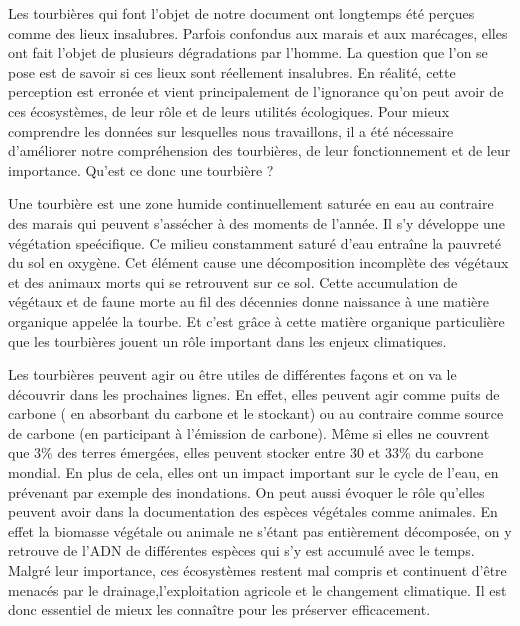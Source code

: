 \documentclass[a4paper,12pt]{report}%
\begin{document}
\begin{justify}

Les tourbières qui font l’objet de notre document ont longtemps été perçues comme des lieux insalubres. Parfois confondus aux marais et aux marécages, elles ont fait l’objet de plusieurs dégradations par l’homme. La question que l’on se pose est de savoir si ces lieux sont réellement insalubres. En réalité, cette perception est erronée et vient principalement de l’ignorance qu’on peut avoir de ces écosystèmes, de leur rôle et de leurs utilités écologiques. Pour mieux comprendre les données sur lesquelles nous travaillons, il a été nécessaire d’améliorer notre compréhension des tourbières, de leur fonctionnement et de leur importance. Qu'est ce donc une tourbière ? \newline					


 Une tourbière est une zone humide continuellement saturée en eau au contraire des marais qui peuvent s’assécher à des moments de l’année. Il s'y développe une végétation speécifique. Ce milieu constamment saturé d’eau entraîne la pauvreté du sol en oxygène.  Cet élément cause une  décomposition incomplète des végétaux et des animaux morts qui se retrouvent sur ce sol. Cette accumulation de végétaux et de faune morte au fil des décennies donne naissance à une matière organique appelée la tourbe.  Et c'est  grâce à cette matière organique particulière que les tourbières jouent un rôle important dans les enjeux climatiques. \newline

Les tourbières peuvent agir ou être utiles de différentes façons et on va le découvrir dans les prochaines lignes. 
En effet, elles peuvent agir comme puits de carbone ( en absorbant du carbone et le stockant) ou au contraire comme source de carbone (en participant à l'émission de carbone). Même si elles ne couvrent que 3\% des terres émergées, elles peuvent stocker entre 30 et 33\% du carbone mondial. En plus de cela, elles ont un impact important sur le cycle de l'eau, en prévenant par exemple des inondations. On peut aussi évoquer le rôle qu’elles peuvent avoir dans la documentation des espèces végétales comme animales. En effet la biomasse végétale ou animale ne s’étant pas entièrement décomposée, on y retrouve de l’ADN de différentes espèces qui s’y est accumulé avec le temps. 
Malgré leur importance, ces écosystèmes restent mal compris et continuent d'être menacés par le drainage,l’exploitation agricole et le changement climatique. Il est donc essentiel de mieux les connaître pour les préserver efficacement.


\end{justify}
\end{document}
